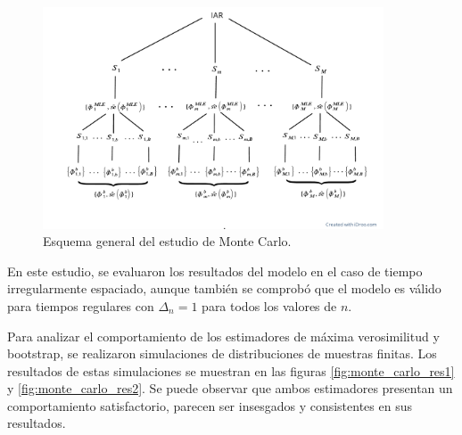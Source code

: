 \begin{figure}[h]
    \includegraphics[trim={0 2cm 0 0},clip,width=0.9\textwidth]{Kap3/Fig_Cap3/4RzQZ8xYXY.pdf}
    \caption{Esquema general del estudio de Monte Carlo.}
    \label{fig:monte_carlo1}
\end{figure}

En este estudio, se evaluaron los resultados del modelo en el caso de tiempo irregularmente espaciado, aunque también se comprobó que el modelo es válido para tiempos regulares con $\Delta_n=1$ para todos los valores de $n$.

Para analizar el comportamiento de los estimadores de máxima verosimilitud y bootstrap, 
se realizaron simulaciones de distribuciones de muestras finitas.
Los resultados de estas simulaciones se muestran en las figuras \ref{fig:monte_carlo_res1} y \ref{fig:monte_carlo_res2}. 
Se puede observar que ambos estimadores presentan un comportamiento satisfactorio, parecen ser insesgados y consistentes en sus resultados.

